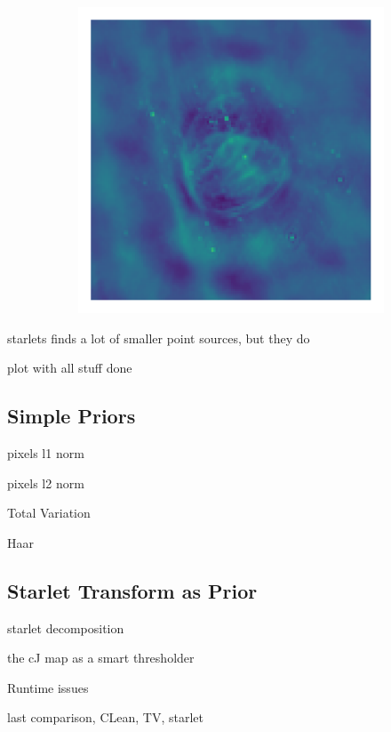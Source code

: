 \begin{figure}[h]
\begin{subfigure}[b]{0.3\linewidth}
	\end{subfigure}
	\begin{subfigure}[b]{0.3\linewidth}
		\includegraphics[width=\linewidth, trim={18px 19px 18px 18px}, clip]{./chapters/05.results/g55/starlets3_residual.png}
	\end{subfigure}
\end{figure}

starlets finds a lot of smaller point sources, but they do

plot with all stuff done

\subsection{Simple Priors}

pixels l1 norm

pixels l2 norm

Total Variation

Haar 

\subsection{Starlet Transform as Prior}

starlet decomposition

the cJ map as a smart thresholder

Runtime issues


last comparison, CLean, TV, starlet